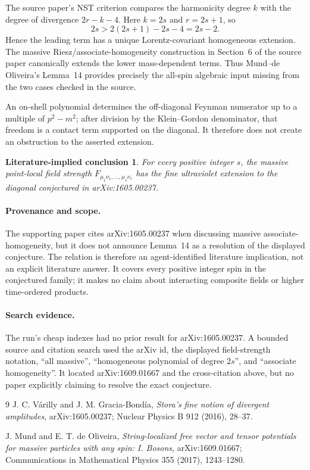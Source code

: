 \documentclass[11pt]{article}
\newtheorem*{claim}{Literature-implied conclusion}
\begin{document}
The source paper's NST criterion compares the harmonicity degree $k$ with the
degree of divergence $2r-k-4$.  Here $k=2s$ and $r=2s+1$, so
\[
 2s>2(2s+1)-2s-4=2s-2.
\]
Hence the leading term has a unique Lorentz-covariant homogeneous extension.
The massive Riesz/associate-homogeneity construction in Section~6 of the
source paper canonically extends the lower mass-dependent terms.  Thus
Mund--de Oliveira's Lemma~14 provides precisely the all-spin algebraic input
missing from the two cases checked in the source.

An on-shell polynomial determines the off-diagonal Feynman numerator up to a
multiple of $p^2-m^2$; after division by the Klein--Gordon denominator, that
freedom is a contact term supported on the diagonal.  It therefore does not
create an obstruction to the asserted extension.

\begin{claim}
For every positive integer $s$, the massive point-local field strength
$F_{\mu_1\nu_1,\ldots,\mu_s\nu_s}$ has the fine ultraviolet extension to the
diagonal conjectured in arXiv:1605.00237.
\end{claim}

\paragraph{Provenance and scope.}
The supporting paper cites arXiv:1605.00237 when discussing massive
associate-homogeneity, but it does not announce Lemma~14 as a resolution of
the displayed conjecture.  The relation is therefore an agent-identified
literature implication, not an explicit literature answer.  It covers every
positive integer spin in the conjectured family; it makes no claim about
interacting composite fields or higher time-ordered products.

\paragraph{Search evidence.}
The run's cheap indexes had no prior result for arXiv:1605.00237.  A bounded
source and citation search used the arXiv id, the displayed field-strength
notation, ``all massive'', ``homogeneous polynomial of degree $2s$'', and
``associate homogeneity''.  It located arXiv:1609.01667 and the cross-citation
above, but no paper explicitly claiming to resolve the exact conjecture.

\begin{thebibliography}{9}
J. C. V\'arilly and J. M. Gracia-Bond\'ia,
\emph{Stora's fine notion of divergent amplitudes},
arXiv:1605.00237; Nuclear Physics B 912 (2016), 28--37.

J. Mund and E. T. de Oliveira,
\emph{String-localized free vector and tensor potentials for massive
particles with any spin: I. Bosons},
arXiv:1609.01667; Communications in Mathematical Physics 355 (2017),
1243--1280.
\end{thebibliography}
\end{document}
